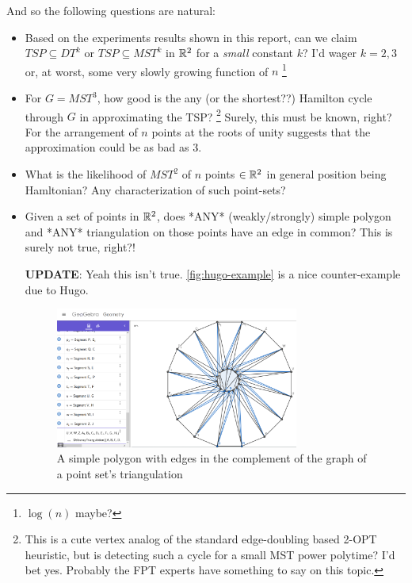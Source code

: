 \begin{appendices}
\begin{description}
     And so the following questions are natural:

     \begin{itemize}
      \item Based on the experiments results shown in this report, can we 
            claim  $TSP \subseteq DT^{k}$ or $TSP \subseteq MST^{k}$ in $\mathbb{R}^2$ 
           for a \textit{small} constant $k$? I'd wager $k=2,3$ or, at worst, some 
           very slowly growing function of $n$ \footnote{$\log (n)$ maybe?}

      \item For $G=MST^3$, how good is the any (or the shortest??) Hamilton cycle through $G$
            in approximating the TSP? \footnote{This is a cute vertex analog of the standard edge-doubling based 2-OPT heuristic, but is detecting such a cycle for a small MST power polytime? I'd bet yes. Probably the FPT experts have something to say on this topic.}  
            Surely, this must be known, right?  For the arrangement of $n$ points at the roots of unity suggests that the 
            approximation could be as bad as 3. 

       \item What is the likelihood of $MST^2$ of $n$ points $\in \mathbb{R}^2$ in general position being Hamltonian? 
             Any characterization of such point-sets? 

       \item Given a set of points in $\mathbb{R}^2$, does *ANY* 
             (weakly/strongly) simple polygon and *ANY* triangulation on those 
             points have an edge in common? This is surely not true, right?!
       
             \large{\textbf{UPDATE}}: Yeah this isn't true.  \autoref{fig:hugo-example} is a nice counter-example due to Hugo. 
             \begin{figure}[H]
             \centering
             \includegraphics[width=8cm]{miscimages/hugo-example.png}
             \caption{\label{fig:hugo-example} A simple polygon with edges in the complement of the graph of a point set's triangulation}
             \end{figure}


\end{itemize}
\end{description}
\end{appendices}
